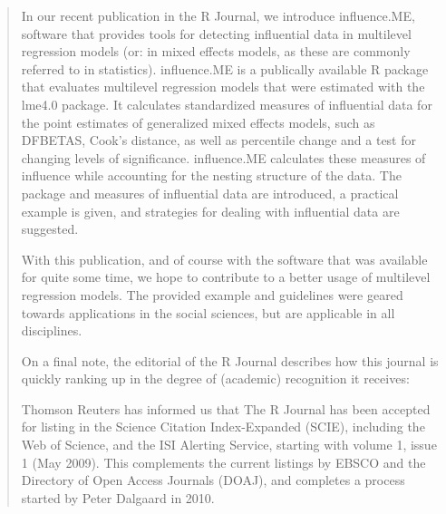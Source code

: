 \begin{quote}

In our recent publication in the R Journal, we introduce influence.ME, software that provides tools for detecting influential data in multilevel regression models (or: in mixed effects models, as these are commonly referred to in statistics). influence.ME is a publically available R package that evaluates multilevel regression models that were estimated with the lme4.0 package. It calculates standardized measures of influential data for the point estimates of generalized mixed effects models, such as DFBETAS, Cook’s distance, as well as percentile change and a test for changing levels of significance. influence.ME calculates these measures of influence while accounting for the nesting structure of the data. The package and measures of influential data are introduced, a practical example is given, and strategies for dealing with influential data are suggested.

With this publication, and of course with the software that was available for quite some time, we hope to contribute to a better usage of multilevel regression models. The provided example and guidelines were geared towards applications in the social sciences, but are applicable in all disciplines.

On a final note, the editorial of the R Journal describes how this journal is quickly ranking up in the degree of (academic) recognition it receives:

Thomson Reuters has informed us that The R Journal has been accepted for listing in the Science Citation Index-Expanded (SCIE), including the Web of Science, and the ISI Alerting Service, starting with volume 1, issue 1 (May 2009). This complements the current listings by EBSCO and the Directory of Open Access Journals (DOAJ), and completes a process started by Peter Dalgaard in 2010.

\end{quote}



